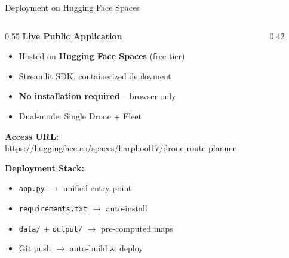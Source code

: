 \documentclass[aspectratio=169, 11pt]{beamer}
\begin{document}
\begin{frame}{Deployment on Hugging Face Spaces}
\begin{columns}[T]
\begin{column}{0.55\textwidth}
\textcolor{neongreen}{\textbf{Live Public Application}}\\[0.2cm]
\small
\begin{itemize}
    \item[\textcolor{neongreen}{$\bullet$}] Hosted on \textbf{Hugging Face Spaces} (free tier)
    \item[\textcolor{neongreen}{$\bullet$}] Streamlit SDK, containerized deployment
    \item[\textcolor{neongreen}{$\bullet$}] \textbf{No installation required} -- browser only
    \item[\textcolor{neongreen}{$\bullet$}] Dual-mode: Single Drone + Fleet
\end{itemize}

\vspace{0.3cm}
\textcolor{accentblue}{\textbf{Access URL:}}\\[0.1cm]
{\small\url{https://huggingface.co/spaces/harphool17/drone-route-planner}}

\vspace{0.3cm}
\textcolor{warnorange}{\textbf{Deployment Stack:}}
\begin{itemize}\small
    \item \texttt{app.py} $\rightarrow$ unified entry point
    \item \texttt{requirements.txt} $\rightarrow$ auto-install
    \item \texttt{data/} + \texttt{output/} $\rightarrow$ pre-computed maps
    \item Git push $\rightarrow$ auto-build \& deploy
\end{itemize}
\end{column}
\begin{column}{0.42\textwidth}
\end{column}
\end{columns}
\end{frame}
\end{document}
